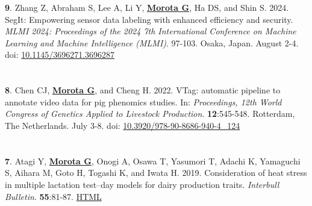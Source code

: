 \documentclass[margin,line,10pt]{res}
\newenvironment{list1}{
  \begin{list}{\ding{113}}{%
      \setlength{\itemsep}{0in}
      \setlength{\parsep}{0in} \setlength{\parskip}{0in}
      \setlength{\topsep}{0in} \setlength{\partopsep}{0in} 
      \setlength{\leftmargin}{0.17in}}}{\end{list}}
\begin{document}
\begin{resume}
\begin{list1}
  \vspace{0.5cm}


\item [{\bf 9}.] Zhang Z, Abraham S, Lee A, Li Y, \textbf{\underline{Morota G}}, Ha DS, and Shin S. 2024. SegIt: Empowering sensor data labeling with enhanced efficiency and security. \emph{MLMI 2024: Proceedings of the 2024 7th International Conference on Machine Learning and Machine Intelligence (MLMI)}. 97-103. Osaka, Japan. August 2-4. doi: \textcolor{blue}{\href{https://doi.org/10.1145/3696271.3696287}{10.1145/3696271.3696287}}


\end{list1}




\section{}
\begin{list1}

\item [{\bf 8}.] Chen CJ, \textbf{\underline{Morota G}}, and Cheng H. 2022. VTag: automatic pipeline to annotate video data for pig phenomics studies. In: \emph{Proceedings, 12th World Congress of Genetics Applied to Livestock Production}. \textbf{12}:545-548. Rotterdam, The Netherlands. July 3-8. doi: \textcolor{blue}{\href{https://doi.org/10.3920/978-90-8686-940-4_124}{10.3920/978-90-8686-940-4\_124}}  

\end{list1}

\section{}
\begin{list1}

\item [{\bf 7}.] Atagi Y, {\bf \underline{Morota G}}, Onogi A, Osawa T, Yasumori T, Adachi K, Yamaguchi S, Aihara M, Goto H, Togashi K, and Iwata H. 2019. Consideration of heat stress in multiple lactation test–day models for dairy production traits. \emph{Interbull Bulletin}. \textbf{55}:81-87. \textcolor{blue}{\href{https://journal.interbull.org/index.php/ib/article/view/185}{HTML}}

\end{list1}


\section{}
\begin{list1}
  

\end{list1}
\end{resume}
\end{document}
